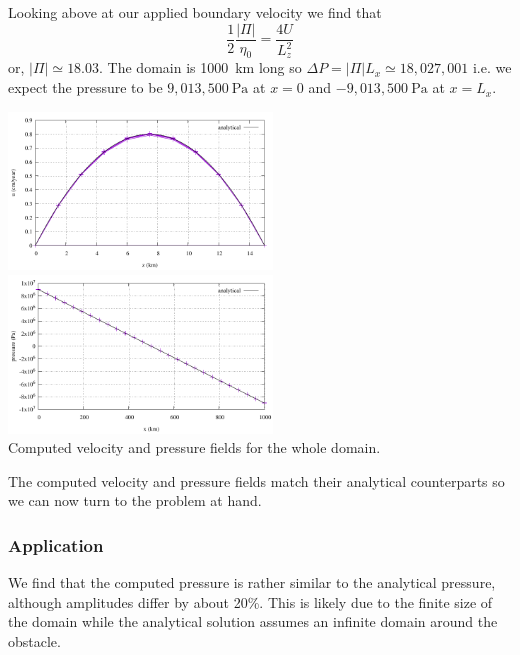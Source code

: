 Looking above at our applied boundary velocity we find that 
\[
\frac{1}{2}\frac{|\Pi|}{\eta_0} = \frac{4U}{L_z^2}
\]
or, $|\Pi|\simeq 18.03$. The domain is 1000~\si{\km} long 
so $\Delta P = |\Pi| L_x \simeq 18,027,001$ i.e. we expect the pressure to 
be $9,013,500~\si{\pascal}$ at $x=0$ and $-9,013,500~\si{\pascal}$ at $x=L_x$. 

\begin{center}
\includegraphics[width=7cm]{python_codes/fieldstone_109/results/bench/vel}
\includegraphics[width=7cm]{python_codes/fieldstone_109/results/bench/press}\\
{\captionfont Computed velocity and pressure fields for the whole domain.}
\end{center}

The computed velocity and pressure fields match their analytical counterparts 
so we can now turn to the problem at hand.

\subsubsection*{Application}

We find that the computed pressure is rather similar to the analytical pressure, although 
amplitudes differ by about 20\%. This is likely due to the finite size of the domain while 
the analytical solution assumes an infinite domain around the obstacle.

